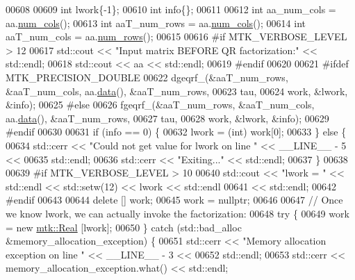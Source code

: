 \begin{DoxyCode}
00608 
00609   \textcolor{keywordtype}{int} lwork\{-1\};
00610   \textcolor{keywordtype}{int} info\{\};
00611 
00612   \textcolor{keywordtype}{int} aa\_num\_cols = aa.\hyperlink{classmtk_1_1DenseMatrix_a41747502d468c6728a4be31501b16e0e}{num\_cols}();
00613   \textcolor{keywordtype}{int} aaT\_num\_rows = aa.\hyperlink{classmtk_1_1DenseMatrix_a41747502d468c6728a4be31501b16e0e}{num\_cols}();
00614   \textcolor{keywordtype}{int} aaT\_num\_cols = aa.\hyperlink{classmtk_1_1DenseMatrix_a53f3afb3b6a8d21854458aaa9663cc74}{num\_rows}();
00615 
00616 \textcolor{preprocessor}{  #if MTK\_VERBOSE\_LEVEL > 12}
00617   std::cout << \textcolor{stringliteral}{"Input matrix BEFORE QR factorization:"} << std::endl;
00618   std::cout << aa << std::endl;
00619 \textcolor{preprocessor}{  #endif}
00620 
00621 \textcolor{preprocessor}{  #ifdef MTK\_PRECISION\_DOUBLE}
00622   dgeqrf\_(&aaT\_num\_rows, &aaT\_num\_cols, aa.\hyperlink{classmtk_1_1DenseMatrix_a0c33b8a9e01d157c61ddbdf807c25d84}{data}(), &aaT\_num\_rows,
00623           tau,
00624           work, &lwork, &info);
00625 \textcolor{preprocessor}{  #else}
00626   fgeqrf\_(&aaT\_num\_rows, &aaT\_num\_cols, aa.\hyperlink{classmtk_1_1DenseMatrix_a0c33b8a9e01d157c61ddbdf807c25d84}{data}(), &aaT\_num\_rows,
00627           tau,
00628           work, &lwork, &info);
00629 \textcolor{preprocessor}{  #endif}
00630 
00631   \textcolor{keywordflow}{if} (info == 0) \{
00632     lwork = (int) work[0];
00633   \} \textcolor{keywordflow}{else} \{
00634     std::cerr << \textcolor{stringliteral}{"Could not get value for lwork on line "} << \_\_LINE\_\_ - 5 <<
00635       std::endl;
00636     std::cerr << \textcolor{stringliteral}{"Exiting..."} << std::endl;
00637   \}
00638 
00639 \textcolor{preprocessor}{  #if MTK\_VERBOSE\_LEVEL > 10}
00640   std::cout << \textcolor{stringliteral}{"lwork = "} << std::endl << std::setw(12) << lwork << std::endl
00641     << std::endl;
00642 \textcolor{preprocessor}{  #endif}
00643 
00644   \textcolor{keyword}{delete} [] work;
00645   work = \textcolor{keyword}{nullptr};
00646 
00647   \textcolor{comment}{// Once we know lwork, we can actually invoke the factorization:}
00648   \textcolor{keywordflow}{try} \{
00649     work = \textcolor{keyword}{new} \hyperlink{group__c01-roots_gac080bbbf5cbb5502c9f00405f894857d}{mtk::Real} [lwork];
00650   \} \textcolor{keywordflow}{catch} (std::bad\_alloc &memory\_allocation\_exception) \{
00651     std::cerr << \textcolor{stringliteral}{"Memory allocation exception on line "} << \_\_LINE\_\_ - 3 <<
00652       std::endl;
00653     std::cerr << memory\_allocation\_exception.what() << std::endl;

\end{DoxyCode}
